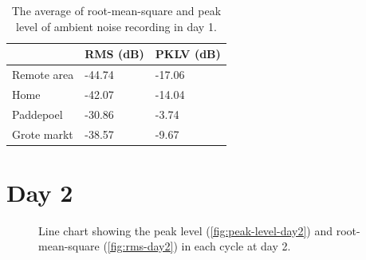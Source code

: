 \begin{table}[H]
\centering
\caption{The average of root-mean-square and peak level of ambient noise recording in day 1.}
\label{tab:ambient-noise-average-day1}
\begin{tabular}{lll} \toprule
            & \ac{RMS} (dB) & \ac{PKLV} (dB) \\ \midrule
Remote area & -44.74                & -17.06          \\
Home        & -42.07                & -14.04           \\
Paddepoel   & -30.86                & -3.74          \\
Grote markt & -38.57              & -9.67        \\ \bottomrule
\end{tabular}
\end{table}




\section{Day 2} %
\label{sec:ambient-noise-day_2}
\begin{figure}[H]
	\begin{adjustwidth}{-4cm}{}
	\centering
	\end{adjustwidth}
	\caption{Line chart showing the peak level (\ref{fig:peak-level-day2}) and root-mean-square (\ref{fig:rms-day2}) in each cycle at day 2.}
	\label{fig:audio-result-day2}
\end{figure}

